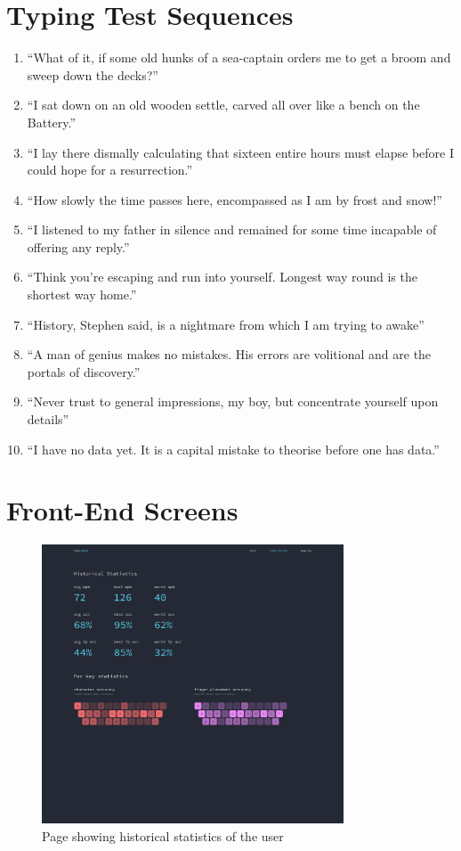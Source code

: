 \documentclass{report}
\begin{document}
\chapter{Typing Test Sequences}
\label{appendix:test-sequences}
\normalsize
\begin{enumerate}
	\item ``What of it, if some old hunks of a sea-captain orders me to get a broom and sweep down the decks?'' \parencite{moby-dick}
	\item ``I sat down on an old wooden settle, carved all over like a bench on the Battery.'' \parencite{moby-dick}
	\item ``I lay there dismally calculating that sixteen entire hours must elapse before I could hope for a resurrection.'' \parencite{moby-dick}
	\item ``How slowly the time passes here, encompassed as I am by frost and snow!'' \parencite{frankenstein}
	\item ``I listened to my father in silence and remained for some time incapable of offering any reply.'' \parencite{frankenstein}
	\item ``Think you’re escaping and run into yourself. Longest way round is the shortest way home.'' \parencite{ulysses}
	\item ``History, Stephen said, is a nightmare from which I am trying to awake'' \parencite{ulysses}
	\item ``A man of genius makes no mistakes. His errors are volitional and are the portals of discovery.'' \parencite{ulysses}
	\item ``Never trust to general impressions, my boy, but concentrate yourself upon details'' \parencite{sherlock}
	\item ``I have no data yet. It is a capital mistake to theorise before one has data.'' \parencite{sherlock}
\end{enumerate}

\chapter{Front-End Screens}
\begin{figure}[H]
	\centering
	\includegraphics[width=0.8\textwidth]{frontend-statistics.png}
	\caption{Page showing historical statistics of the user}
	\centering
\end{figure}
\end{document}
